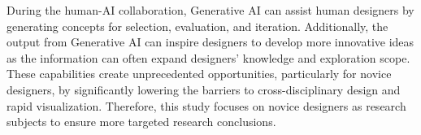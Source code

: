 During the human-AI collaboration, Generative AI can assist human designers by generating concepts for selection, evaluation, and iteration. Additionally, the output from Generative AI can inspire designers to develop more innovative ideas as the information can often expand designers’ knowledge and exploration scope. These capabilities create unprecedented opportunities, particularly for novice designers, by significantly lowering the barriers to cross-disciplinary design and rapid visualization. Therefore, this study focuses on novice designers as research subjects to ensure more targeted research conclusions.